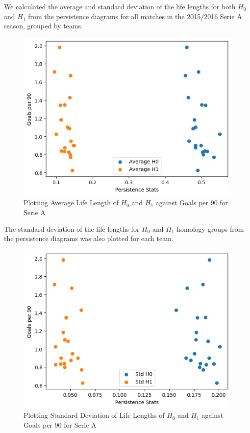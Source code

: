 \documentclass[10pt,twocolumn]{article}
\begin{document}
We calculated the average and standard deviation of the life lengths for both $ H_0 $ and $ H_1 $ from the persistence diagrams for all matches in the 2015/2016 Serie A season, grouped by teams. 
\begin{figure}[H]
    \centering
    \includegraphics[width=0.95\linewidth]{images/avg_H0_vs_gp90_serie_A.png}
    \caption{Plotting Average Life Length of $ H_0 $ and $ H_1 $ against Goals per 90 for Serie A}
    \label{fig:avg_life_vs_gp90_serie_A}
\end{figure}

The standard deviation of the life lengths for $ H_0 $ and $ H_1 $ homology groups from the persistence diagrams was also plotted for each team.

\begin{figure}[H]
    \includegraphics[width=1\linewidth]{images/std_H0_vs_gp90_serie_A.png}
    \caption{Plotting Standard Deviation of Life Lengths of $ H_0 $ and $ H_1 $ against Goals per 90 for Serie A}
    \label{fig:std_life_vs_gp90_serie_A}
\end{figure}
\end{document}
